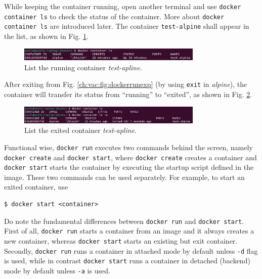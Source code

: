 While keeping the container running, open another terminal and use \verb|docker container ls| to check the status of the container. More about \verb|docker container ls| are introduced later. The container \verb|test-alpine| shall appear in the list, as shown in Fig. \ref{ch:vac:fig:dockerrunexppart2}.
\begin{figure}[!htb]
	\centering
	\includegraphics[width=250pt]{chapters/part-3/figures/dockerrunexppart2.png}
	\caption{List the running container \textit{test-apline}.} \label{ch:vac:fig:dockerrunexppart2}
\end{figure}
After exiting from Fig. \ref{ch:vac:fig:dockerrunexp} (by using \verb|exit| in \textit{alpine}), the container will transfer its status from ``running'' to ``exited'', as shown in Fig. \ref{ch:vac:fig:dockerrunexppart3}.
\begin{figure}[!htb]
	\centering
	\includegraphics[width=250pt]{chapters/part-3/figures/dockerrunexppart3.png}
	\caption{List the exited container \textit{test-apline}.} \label{ch:vac:fig:dockerrunexppart3}
\end{figure}

Functional wise, \verb|docker run| executes two commands behind the screen, namely \verb|docker create| and \verb|docker start|, where \verb|docker create| creates a container and \verb|docker start| starts the container by executing the startup script defined in the image. These two commands can be used separately. For example, to start an exited container, use
\begin{lstlisting}
$ docker start <container>
\end{lstlisting}

\begin{shortbox}

Do note the fundamental differences between \verb|docker run| and \verb|docker start|. First of all, \verb|docker run| starts a container from an image and it always creates a new container, whereas \verb|docker start| starts an existing but exit container. Secondly, \verb|docker run| runs a container in attached mode by default unless \verb|-d| flag is used, while in contrast \verb|docker start| runs a container in detached (backend) mode by default unless \verb|-a| is used. 
\end{shortbox}


